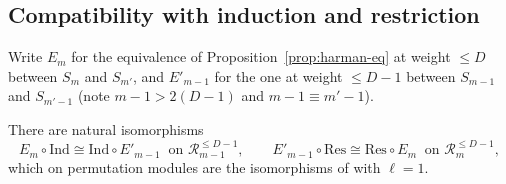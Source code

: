 \subsection{Compatibility with induction and restriction}\label{app:lemmaB}

Write $E_m$ for the equivalence of Proposition~\ref{prop:harman-eq} at weight $\le D$ between
$S_m$ and $S_{m'}$, and $E'_{m-1}$ for the one at weight $\le D-1$ between $S_{m-1}$ and
$S_{m'-1}$ (note $m-1>2(D-1)$ and $m-1\equiv m'-1$).

\begin{lemma}[B]\label{lem:B}
There are natural isomorphisms
\[
  E_m\circ\mathrm{Ind}\cong\mathrm{Ind}\circ E'_{m-1}\ \text{ on }\mathcal R^{\le D-1}_{m-1},\qquad
  E'_{m-1}\circ\mathrm{Res}\cong\mathrm{Res}\circ E_m\ \text{ on }\mathcal R^{\le D-1}_{m},
\]
which on permutation modules are the isomorphisms of \cite[Prop.~2.7]{harman2015} with
$\ell=1$.
\end{lemma}

